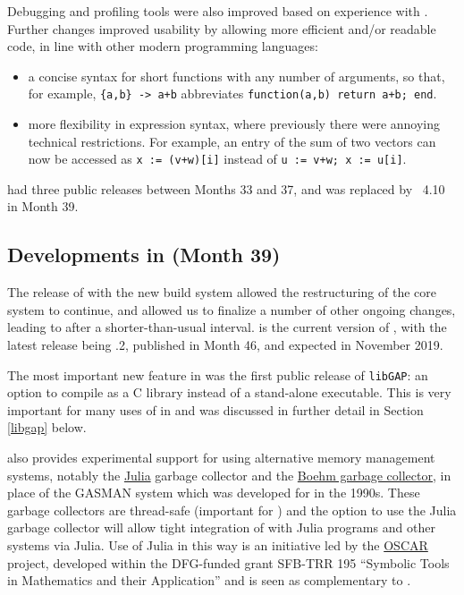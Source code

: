 Debugging  and profiling tools were also improved based on experience with
. Further changes improved \GAP
usability by allowing more efficient and/or readable code, in line
with other modern programming languages:
\begin{itemize}
  \item a concise syntax for short
    functions with any number of arguments, so that, for example,
    \verb|{a,b} -> a+b| abbreviates \verb|function(a,b) return a+b; end|. 
\item more flexibility in \GAP expression syntax,
  where previously there were annoying technical restrictions. For
  example, an entry of the sum of two vectors can now be accessed as
  \verb|x := (v+w)[i]| instead of \verb|u := v+w; x := u[i]|.
  

\end{itemize}

 had three public releases between Months 33 and 37, and
was replaced by \GAP~4.10 in Month 39.

\subsection{Developments in  (Month 39)}\label{gap-4.10}

The release of  with the new build system allowed the
restructuring of the core \GAP system to continue, and allowed us to
finalize a number of other ongoing changes, leading to 
after a shorter-than-usual interval.  is the current
version of \GAP, with the latest release being .2, published
in Month 46, and  expected in November 2019.

The most important new feature in  was the first public
release of \texttt{libGAP}: an
option to compile \GAP as a C library instead of a stand-alone
executable. This is very important for many uses of \GAP in \ODK and
was discussed in further detail in Section \ref{libgap} below.

 also provides experimental support for using alternative
memory management systems, notably the \href{https://julialang.org/}{Julia} garbage
collector and the \href{http://www.hboehm.info/gc/}{Boehm garbage collector}, in place of the
GASMAN system which was developed for  in the 1990s.  These
garbage collectors are thread-safe (important for \HPCGAP) and the
option to use the Julia garbage collector will allow tight integration
of \GAP with Julia programs and other systems via Julia. Use of Julia
in this way is an initiative led by the
\href{https://oscar.computeralgebra.de/}{OSCAR} project, developed
within the DFG-funded grant SFB-TRR 195 ``Symbolic Tools in
Mathematics and their Application'' and is seen as complementary to \ODK.

